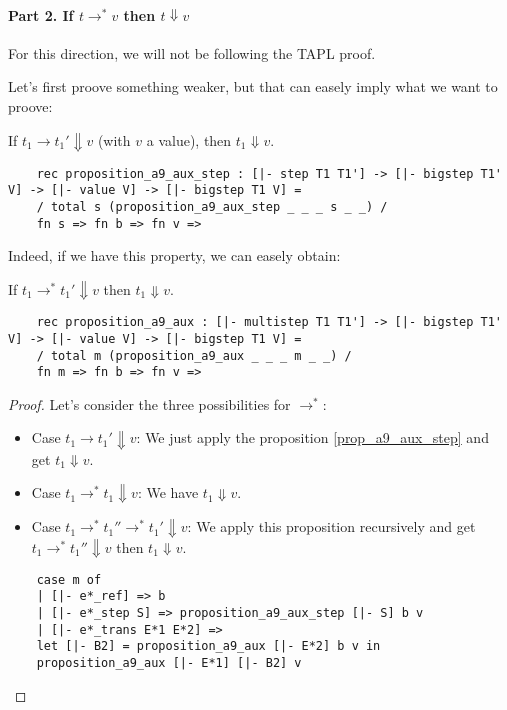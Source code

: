 \paragraph{Part 2. If $t \longrightarrow^* v$ then $t \Downarrow v$ }

For this direction, we will not be following the TAPL proof.

Let's first proove something weaker, but that can easely imply what we want to
proove:

\begin{proposition}\label{prop_a9_aux_step}
  If $t_1 \longrightarrow t_1' \Downarrow v$ (with $v$ a value),
  then $t_1 \Downarrow v$.
  \begin{lstlisting}
    rec proposition_a9_aux_step : [|- step T1 T1'] -> [|- bigstep T1' V] -> [|- value V] -> [|- bigstep T1 V] =
    / total s (proposition_a9_aux_step _ _ _ s _ _) /
    fn s => fn b => fn v =>
  \end{lstlisting}
\end{proposition}

Indeed, if we have this property, we can easely obtain:

\begin{proposition}[A9-aux]\label{prop_a9_aux}
  If $t_1 \longrightarrow^* t_1' \Downarrow v$ then $t_1 \Downarrow v$.
  \begin{lstlisting}
    rec proposition_a9_aux : [|- multistep T1 T1'] -> [|- bigstep T1' V] -> [|- value V] -> [|- bigstep T1 V] =
    / total m (proposition_a9_aux _ _ _ m _ _) /
    fn m => fn b => fn v =>
  \end{lstlisting}
\end{proposition}
\begin{proof}
  Let's consider the three possibilities for $\rightarrow^*$:
  \begin{itemize}
  \item Case $t_1 \longrightarrow t_1' \Downarrow v$: We just apply the
    proposition \ref{prop_a9_aux_step} and get $t_1 \Downarrow v$.
  \item Case $t_1 \longrightarrow^* t_1 \Downarrow v$: We have
    $t_1 \Downarrow v$.
  \item Case $t_1 \longrightarrow^* t_1'' \longrightarrow^* t_1' \Downarrow v$:
    We apply this proposition recursively and get $t_1 \longrightarrow^* t_1''
    \Downarrow v$ then $t_1 \Downarrow v$.
  \end{itemize}
  \begin{lstlisting}
    case m of
    | [|- e*_ref] => b
    | [|- e*_step S] => proposition_a9_aux_step [|- S] b v
    | [|- e*_trans E*1 E*2] =>
    let [|- B2] = proposition_a9_aux [|- E*2] b v in
    proposition_a9_aux [|- E*1] [|- B2] v
  \end{lstlisting}
\end{proof}

